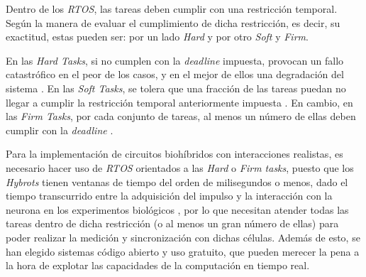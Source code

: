 
Dentro de los \textit{RTOS}, las tareas deben cumplir con una restricción temporal. Según la manera de evaluar el cumplimiento de dicha restricción, es decir, su exactitud, estas pueden ser: por un lado \textit{Hard} y por otro \textit{Soft} y \textit{Firm}.

En las \textit{Hard Tasks}, si no cumplen con la \textit{deadline} impuesta, provocan un fallo catastrófico en el peor de los casos, y en el mejor de ellos una degradación del sistema \cite{Lipari2015}. En las \textit{Soft Tasks}, se tolera que una fracción de las tareas puedan no llegar a cumplir la restricción temporal anteriormente impuesta \cite{Erickson2022}. En cambio, en las \textit{Firm Tasks}, por cada conjunto de tareas, al menos un número de ellas deben cumplir con la \textit{deadline} \cite{Behrouzian2020}.

Para la implementación de circuitos biohíbridos con interacciones realistas, es necesario hacer uso de \textit{RTOS} orientados a las \textit{Hard} o \textit{Firm tasks}, puesto que los \textit{Hybrots} tienen ventanas de tiempo del orden de milisegundos o menos, dado el tiempo transcurrido entre la adquisición del impulso y la interacción con la neurona en los experimentos biológicos \cite{Amaducci2019}, por lo que necesitan atender todas las tareas dentro de dicha restricción (o al menos un gran número de ellas) para poder realizar la medición y sincronización con dichas células. Además de esto, se han elegido sistemas código abierto y uso gratuito, que pueden merecer la pena a la hora de explotar las capacidades de la computación en tiempo real.
